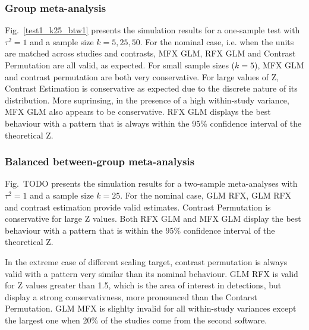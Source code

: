 \documentclass[preprint]{elsarticle}
\newcommand{\nStudies}{k}
\newcommand{\varBetween}{\tau^2}
\begin{document}
\subsubsection{Group meta-analysis}

Fig.~\ref{test1_k25_btw1} presents the simulation results for a one-sample test with $\varBetween=1$ and a sample size $\nStudies = 5, 25, 50$. For the nominal case, i.e. when the units are matched across studies and contrasts, MFX GLM, RFX GLM and Contrast Permutation are all valid, as expected. For small sample sizes ($\nStudies = 5$), MFX GLM and contrast permutation are both very conservative. For large values of Z, Contrast Estimation is conservative as expected due to the discrete nature of its distribution. More suprinsing, in the presence of a high within-study variance, MFX GLM also appears to be conservative. RFX GLM displays the best behaviour with a pattern that is always within the 95\% confidence interval of the theoretical Z.



\subsubsection{Balanced between-group meta-analysis}

Fig.~TODO presents the simulation results for a two-sample meta-analyses with $\varBetween=1$ and a sample size $\nStudies = 25$. For the nominal case, GLM RFX, GLM RFX and contrast estimation provide valid estimates. Contrast Permutation is conservative for large Z values. Both RFX GLM and MFX GLM display the best behaviour with a pattern that is within the 95\% confidence interval of the theoretical Z.

In the extreme case of different scaling target, contrast permutation is always valid with a pattern very similar than its nominal behaviour. GLM RFX is valid for Z values greater than 1.5, which is the area of interest in detections, but display a strong conservativness, more pronounced than the Contarst Permutation. GLM MFX is slighlty invalid for all within-study variances except the largest one when 20\% of the studies come from the second software.
\end{document}
